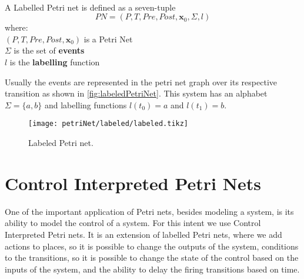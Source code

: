 \begin{definition}
  \label{def:petriNet}~\\
  A Labelled Petri net is defined as a seven-tuple
  \[PN = (P,T,Pre,Post,\mathbf{x}_0,\Sigma,l)\]
  where: \\
  \indent $(P,T,Pre,Post,\mathbf{x}_0)$ is a Petri Net\\
  \indent $\Sigma$ is the set of \textbf{events} \\
  \indent $l$ is the \textbf{labelling} function  \\
\end{definition}

Usually the events are represented in the petri net graph over its respective
transition as shown in \autoref{fig:labeledPetriNet}. This system has an alphabet
$\Sigma=\{a,b\}$ and labelling functions $l(t_0)=a$ and $l(t_1)=b$.

\begin{figure}[H]
  \centering
  \texttt{[image: petriNet/labeled/labeled.tikz]}
  \caption{Labeled Petri net.}
  \label{fig:labeledPetriNet}
\end{figure}

\section{Control Interpreted Petri Nets}
\label{sec:cipn}
One of the important application of Petri nets, besides modeling a system, is its
ability to model the control of a system. For this intent we use Control Interpreted Petri nets. It is an
extension of labelled Petri nets, where we add actions to places, so it is
possible to change the outputs of the system, conditions to the transitions, so it
is possible to change the state of the control based on the inputs of the
system, and the ability to delay the firing transitions based on time.


